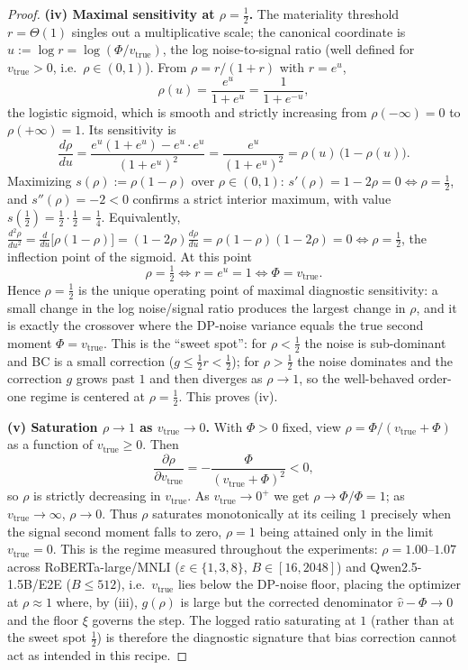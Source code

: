 \begin{proof}
\medskip
\noindent\textbf{(iv) Maximal sensitivity at $\rho=\tfrac12$.}
The materiality threshold $r=\Theta(1)$ singles out a multiplicative scale; the canonical coordinate is $u:=\log r=\log(\Phi/v_{\mathrm{true}})$, the log noise-to-signal ratio (well defined for $v_{\mathrm{true}}>0$, i.e.\ $\rho\in(0,1)$). From $\rho=r/(1+r)$ with $r=e^{u}$,
\[
\rho(u)=\frac{e^{u}}{1+e^{u}}=\frac{1}{1+e^{-u}},
\]
the logistic sigmoid, which is smooth and strictly increasing from $\rho(-\infty)=0$ to $\rho(+\infty)=1$. Its sensitivity is
\[
\frac{d\rho}{du}=\frac{e^{u}(1+e^{u})-e^{u}\cdot e^{u}}{(1+e^{u})^2}=\frac{e^{u}}{(1+e^{u})^2}=\rho(u)\,\big(1-\rho(u)\big).
\]
Maximizing $s(\rho):=\rho(1-\rho)$ over $\rho\in(0,1)$: $s'(\rho)=1-2\rho=0\iff\rho=\tfrac12$, and $s''(\rho)=-2<0$ confirms a strict interior maximum, with value $s(\tfrac12)=\tfrac12\cdot\tfrac12=\tfrac14$. Equivalently, $\tfrac{d^2\rho}{du^2}=\tfrac{d}{du}\big[\rho(1-\rho)\big]=(1-2\rho)\tfrac{d\rho}{du}=\rho(1-\rho)(1-2\rho)=0\iff\rho=\tfrac12$, the inflection point of the sigmoid. At this point
\[
\rho=\tfrac12\iff r=e^{u}=1\iff \Phi=v_{\mathrm{true}} .
\]
Hence $\rho=\tfrac12$ is the unique operating point of maximal diagnostic sensitivity: a small change in the log noise/signal ratio produces the largest change in $\rho$, and it is exactly the crossover where the DP-noise variance equals the true second moment $\Phi=v_{\mathrm{true}}$. This is the ``sweet spot'': for $\rho<\tfrac12$ the noise is sub-dominant and BC is a small correction ($g\le\tfrac12 r<\tfrac12$); for $\rho>\tfrac12$ the noise dominates and the correction $g$ grows past $1$ and then diverges as $\rho\to1$, so the well-behaved order-one regime is centered at $\rho=\tfrac12$. This proves (iv).

\medskip
\noindent\textbf{(v) Saturation $\rho\to 1$ as $v_{\mathrm{true}}\to 0$.}
With $\Phi>0$ fixed, view $\rho=\Phi/(v_{\mathrm{true}}+\Phi)$ as a function of $v_{\mathrm{true}}\ge 0$. Then
\[
\frac{\partial\rho}{\partial v_{\mathrm{true}}}=-\frac{\Phi}{(v_{\mathrm{true}}+\Phi)^2}<0,
\]
so $\rho$ is strictly decreasing in $v_{\mathrm{true}}$. As $v_{\mathrm{true}}\to 0^{+}$ we get $\rho\to \Phi/\Phi=1$; as $v_{\mathrm{true}}\to\infty$, $\rho\to 0$. Thus $\rho$ saturates monotonically at its ceiling $1$ precisely when the signal second moment falls to zero, $\rho=1$ being attained only in the limit $v_{\mathrm{true}}=0$. This is the regime measured throughout the experiments: $\rho=1.00$--$1.07$ across RoBERTa-large/MNLI ($\varepsilon\in\{1,3,8\}$, $B\in[16,2048]$) and Qwen2.5-1.5B/E2E ($B\le512$), i.e.\ $v_{\mathrm{true}}$ lies below the DP-noise floor, placing the optimizer at $\rho\approx1$ where, by (iii), $g(\rho)$ is large but the corrected denominator $\hat v-\Phi\to0$ and the floor $\xi$ governs the step. The logged ratio saturating at $1$ (rather than at the sweet spot $\tfrac12$) is therefore the diagnostic signature that bias correction cannot act as intended in this recipe.


\end{proof}
